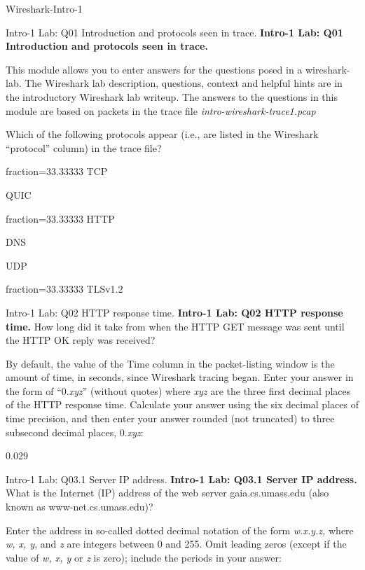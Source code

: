 \documentclass[a4paper]{article}
\begin{document}
\begin{quiz}{Wireshark-Intro-1}

\begin{multi}[points=1,multiple]{Intro-1 Lab: Q01 Introduction and protocols seen in trace.}
\textbf{Intro-1 Lab: Q01 Introduction and protocols seen in trace.}

This module allows you to enter answers for the questions posed in a wireshark-lab. The Wireshark lab description, questions, context and helpful hints are in the introductory Wireshark lab writeup. The answers to the questions in this module are based on packets in the trace file \emph{intro-wireshark-trace1.pcap}

Which of the following protocols appear (i.e., are listed in the Wireshark ``protocol'' column) in the trace file? 

\item[fraction=33.33333] TCP
\item QUIC
\item[fraction=33.33333] HTTP
\item DNS
\item UDP
\item[fraction=33.33333] TLSv1.2
\end{multi}

\begin{shortanswer}[points=1]{Intro-1 Lab: Q02 HTTP response time.}
\textbf{Intro-1 Lab: Q02 HTTP response time.} 
How long did it take from when the HTTP GET message was sent until the HTTP OK reply was received? 

By default, the value of the Time column in the packet-listing window is the amount of time, in seconds, since Wireshark tracing began.  Enter your answer in the form of ``0.\emph{xyz}'' (without quotes) where \emph{xyz} are the three first decimal places of the HTTP response time. Calculate your answer using the six decimal places of time precision, and then enter your answer rounded (not truncated) to three subsecond decimal places, 0.\emph{xyz}:

\item 0.029
\end{shortanswer}

\begin{shortanswer}[points=1]{Intro-1 Lab: Q03.1 Server IP address.}
\textbf{Intro-1 Lab: Q03.1 Server IP address.} 
What is the Internet (IP) address of the web server gaia.cs.umass.edu (also known as www-net.cs.umass.edu)? 

Enter the address in so-called dotted decimal notation of the form \emph{w.x.y.z,} where  \emph{w, x, y}, and \emph{z} are integers between 0 and 255. Omit leading zeros (except if the value of \emph{w, x, y} or \emph{z} is zero); include the periods in your answer: 


\end{shortanswer}
\end{quiz}
\end{document}
